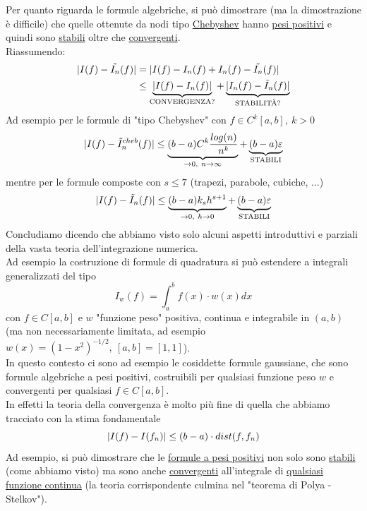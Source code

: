 \documentclass[12pt,a4paper]{article}
\DeclarePairedDelimiter{\abs}{\lvert}{\rvert}
\begin{document}
Per quanto riguarda le formule algebriche, si può dimostrare (ma la dimostrazione è difficile) che quelle ottenute da nodi tipo \underline{Chebyshev} hanno \underline{pesi positivi} e quindi sono \underline{stabili} oltre che \underline{convergenti}.\\
Riassumendo:
\[
\begin{split}
\abs{I(f) - \tilde{I_n}(f)} & = \abs{I(f) - I_n(f) + I_n (f) - \tilde{I_n}(f)} \\
& \le \underbrace{\abs{I(f) - I_n (f)}}_{\text{CONVERGENZA?}} + \underbrace{\abs{I_n (f) - \tilde{I}_n (f)}}_{\text{STABILITÀ?}}
\end{split}
\]
Ad esempio per le formule di "tipo Chebyshev" con $f \in C^k [a,b], \ k > 0$
\[
\abs{I(f) - \tilde{I}_n^{cheb}(f)} \le \underbrace{(b-a) C^k \frac{log(n)}{n^k}}_{\to 0, \ n \to \infty} + \underbrace{(b-a)\varepsilon}_{\text{STABILI}}
\]
mentre per le formule composte con $s \le 7$ (trapezi, parabole, cubiche, $\dotso$)
\[
\abs{I(f) - \tilde{I}_n(f)} \le \underbrace{(b-a)k_s h^{s+1}}_{\to 0, \ h \to 0} + \underbrace{(b-a)\varepsilon}_{\text{STABILI}}
\]
Concludiamo dicendo che abbiamo visto solo alcuni aspetti introduttivi e parziali della vasta teoria dell'integrazione numerica.\\
Ad esempio la costruzione di formule di quadratura si può estendere a integrali generalizzati del tipo
\[
I_w (f) = \int_a^b f(x) \cdot w(x) dx
\]
con $f \in C[a,b]$ e $w$ "funzione peso" positiva, continua e integrabile in $(a,b)$ (ma non necessariamente limitata, ad esempio $w(x) = (1-x^2)^{-1/2}, \ [a,b] = [1,1]$).\\
In questo contesto ci sono ad esempio le cosiddette formule gaussiane, che sono formule algebriche a pesi positivi, costruibili per qualsiasi funzione peso $w$ e convergenti per qualsiasi $f \in C [a,b]$.\\
In effetti la teoria della convergenza è molto più fine di quella che abbiamo tracciato con la stima fondamentale
\[
\abs{I(f) - I(f_n)} \le (b-a) \cdot dist(f, f_n)
\]
Ad esempio, si può dimostrare che le \underline{formule a pesi positivi} non solo sono \underline{stabili} (come
abbiamo visto) ma sono anche \underline{convergenti} all'integrale di \underline{qualsiasi funzione continua} (la teoria corrispondente culmina nel "teorema di Polya - Stelkov").
\end{document}
